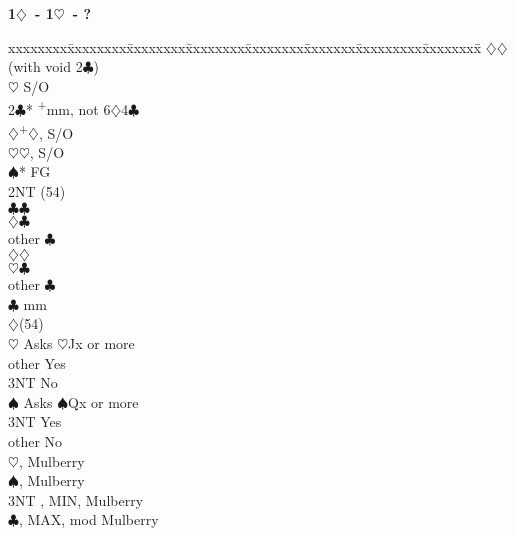 \documentclass[10pt]{article}
\renewcommand{\c}{$\clubsuit$}
\renewcommand{\d}{$\diamondsuit$}
\newcommand{\h}{$\heartsuit$}
\newcommand{\s}{$\spadesuit$}
\newcommand{\p}{\textsuperscript{+}}
\newenvironment{bidtable}[1][]
{\textbf{#1}
  \begin{adjustwidth}{1em}{}
    \addvspace{2pt}
    \begin{tabbing}
      xxxxxxxx\=xxxxxxxx\=xxxxxxxx\=xxxxxxxx\=xxxxxxxx\=xxxxxxx\=xxxxxxxxx\=xxxxxxxx\=\kill}
{\end{tabbing}\end{adjustwidth}\bigskip}%
\begin{document}
\begin{bidtable}[1\d\ - 1\h\ - ?]
     \d  {}\d (with void 2\c)                             \\
     \h  \> S/O                                             \\
2\c* {}\p mm, not 6\d 4\c                                    \\
     \d  {}\p\d, S/O                                      \\
     \h  {}\h, S/O                                        \\
     \s* \> FG                                              \\
     \>      \> 2NT (54)                                   \\
     \>      \>     \c  {}\c                              \\
     \>      \>     \>      \d   {}\c                     \\
     \>      \>     \>      \> other \c                     \\
     \>      \>     \d  {}\d                              \\
     \>      \>     \>      \h   {}\c                     \\
     \>      \>     \>      \> other \c                     \\
     \>      \c {} mm                                    \\
     \>      \d {}(54)                                   \\
     \>      \>     \h  \> Asks \h Jx or more               \\
     \>      \>     \>      \> other \> Yes                     \\
     \>      \>     \>      \> 3NT   \> No                      \\
     \>      \>     \s  \> Asks \s Qx or more               \\
     \>      \>     \>      \> 3NT   \> Yes                     \\
     \>      \>     \>      \> other \> No                      \\
     \>      \h {}, Mulberry                           \\
     \>      \s {}, Mulberry                           \\
     \>      \> 3NT , MIN, Mulberry                      \\
     \>      \c {}, MAX, mod Mulberry                  \\

\end{bidtable}
\end{document}

